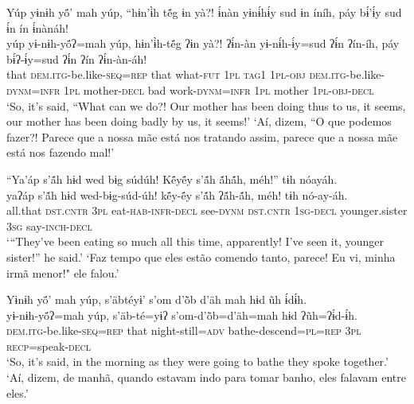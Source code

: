 \documentclass[output=paper,
modfonts,nonflat
]{langsci/langscibook}
\begin{document}
\newpage
\ea  Yúp yɨnɨh yö́’ mah yúp, “hɨn’ɨ̀h të́g ɨn yà?!  ɨ́nàn yɨnɨ́hɨ́y sud ɨn íníh, páy bɨ́’ɨ́y sud ɨ́n ín ɨ́nànáh!{\footnotemark}\\
\gll yúp yɨ-nɨh-yö́ʔ=mah yúp, hɨn’ɨ̀h-të́g ʔɨn yà?!  ʔɨ́n-àn yɨ-nɨ́h-ɨ́y=sud ʔɨ́n ʔín-íh, páy bɨ́ʔ-ɨ́y=sud ʔɨ́n ʔín ʔɨ́n-àn-áh!\\
     that \textsc{dem.itg-}be.like\textsc{-seq=rep} that what\textsc{-fut} \textsc{1pl} \textsc{tag1} \textsc{1pl-obj} \textsc{dem.itg-}be.like\textsc{-dynm=infr}  \textsc{1pl} mother\textsc{-decl} bad work\textsc{-dynm=infr} \textsc{1pl} mother \textsc{1pl-obj-decl}\\
\glt ‘So, it’s said, “What can we do?! Our mother has been doing thus to us, it seems, our mother has been doing badly by us, it seems!'
\glt ‘Aí, dizem, “O que podemos fazer?! Parece que a nossa mãe está nos tratando assim, parece que a nossa mãe está nos fazendo mal!'
\z 

\ea  “Ya’áp s’ã́h hɨd wed bɨg súdúh!  Kë́yë́y s’ã́h ã́hã́h, méh!” tɨh nóayáh.{\footnotemark}\\
\gll yaʔáp s’ã́h hɨd wed-bɨg-súd-úh!  kë́y-ë́y s’ã́h ʔã́h-ã́h, méh! tɨh nó-ay-áh.\\
     all.that \textsc{dst.cntr} \textsc{3pl} eat\textsc{-hab-infr-decl} see\textsc{-dynm} \textsc{dst.cntr} \textsc{1sg-decl} younger.sister \textsc{3sg} say\textsc{-inch-decl}\\
\glt ‘“They’ve been eating so much all this time, apparently! I’ve seen it, younger sister!” he said.'
\glt ‘Faz tempo que eles estão comendo tanto, parece! Eu vi, minha irmã menor!" ele falou.'
\z 

\newpage
\ea  Yɨnɨh yö́’ mah yúp, s’äbtéyɨ’ s’om d’ö̀b d’äh mah hɨd ũh ɨ́dɨ́h.{\footnotemark}\\ 
\gll yɨ-nɨh-yö́ʔ=mah yúp, s’äb-té=yɨʔ s’om-d’ö̀b=d’äh=mah hɨd ʔũh=ʔɨ́d-ɨ́h.\\
     \textsc{dem.itg-}be.like\textsc{-seq=rep} that night-still\textsc{=adv} bathe-descend\textsc{=pl=rep} \textsc{3pl} \textsc{recp=}speak\textsc{-decl}\\
\glt ‘So, it’s said, in the morning as they were going to bathe they spoke together.'
\glt ‘Aí, dizem, de manhã, quando estavam indo para tomar banho, eles falavam entre eles.'
\z 
\end{document}
